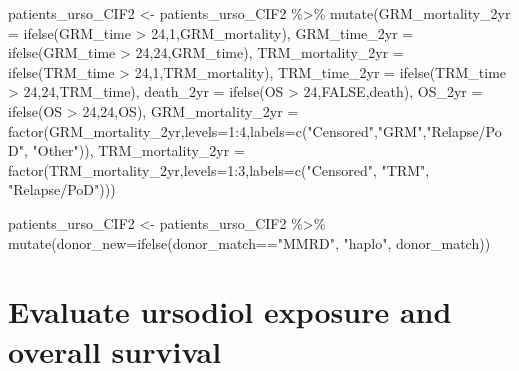 \documentclass[
]{book}
\newenvironment{Shaded}{\begin{snugshade}}{\end{snugshade}}
\newcommand{\AttributeTok}[1]{\textcolor[rgb]{0.77,0.63,0.00}{#1}}
\newcommand{\ConstantTok}[1]{\textcolor[rgb]{0.00,0.00,0.00}{#1}}
\newcommand{\DecValTok}[1]{\textcolor[rgb]{0.00,0.00,0.81}{#1}}
\newcommand{\FunctionTok}[1]{\textcolor[rgb]{0.00,0.00,0.00}{#1}}
\newcommand{\NormalTok}[1]{#1}
\newcommand{\OtherTok}[1]{\textcolor[rgb]{0.56,0.35,0.01}{#1}}
\newcommand{\SpecialCharTok}[1]{\textcolor[rgb]{0.00,0.00,0.00}{#1}}
\newcommand{\StringTok}[1]{\textcolor[rgb]{0.31,0.60,0.02}{#1}}
\begin{document}
\begin{Shaded}
\begin{Highlighting}[]
\NormalTok{patients\_urso\_CIF2 }\OtherTok{\textless{}{-}}\NormalTok{ patients\_urso\_CIF2 }\SpecialCharTok{\%\textgreater{}\%} 
  \FunctionTok{mutate}\NormalTok{(}\AttributeTok{GRM\_mortality\_2yr =} \FunctionTok{ifelse}\NormalTok{(GRM\_time }\SpecialCharTok{\textgreater{}} \DecValTok{24}\NormalTok{,}\DecValTok{1}\NormalTok{,GRM\_mortality), }
         \AttributeTok{GRM\_time\_2yr =} \FunctionTok{ifelse}\NormalTok{(GRM\_time }\SpecialCharTok{\textgreater{}} \DecValTok{24}\NormalTok{,}\DecValTok{24}\NormalTok{,GRM\_time), }
         \AttributeTok{TRM\_mortality\_2yr =} \FunctionTok{ifelse}\NormalTok{(TRM\_time }\SpecialCharTok{\textgreater{}} \DecValTok{24}\NormalTok{,}\DecValTok{1}\NormalTok{,TRM\_mortality), }
         \AttributeTok{TRM\_time\_2yr =} \FunctionTok{ifelse}\NormalTok{(TRM\_time }\SpecialCharTok{\textgreater{}} \DecValTok{24}\NormalTok{,}\DecValTok{24}\NormalTok{,TRM\_time), }
         \AttributeTok{death\_2yr =} \FunctionTok{ifelse}\NormalTok{(OS }\SpecialCharTok{\textgreater{}} \DecValTok{24}\NormalTok{,}\ConstantTok{FALSE}\NormalTok{,death), }
         \AttributeTok{OS\_2yr =} \FunctionTok{ifelse}\NormalTok{(OS }\SpecialCharTok{\textgreater{}} \DecValTok{24}\NormalTok{,}\DecValTok{24}\NormalTok{,OS),}
         \AttributeTok{GRM\_mortality\_2yr =} \FunctionTok{factor}\NormalTok{(GRM\_mortality\_2yr,}\AttributeTok{levels=}\DecValTok{1}\SpecialCharTok{:}\DecValTok{4}\NormalTok{,}\AttributeTok{labels=}\FunctionTok{c}\NormalTok{(}\StringTok{"Censored"}\NormalTok{,}\StringTok{"GRM"}\NormalTok{,}\StringTok{"Relapse/PoD"}\NormalTok{,  }\StringTok{"Other"}\NormalTok{)),  }
         \AttributeTok{TRM\_mortality\_2yr =} \FunctionTok{factor}\NormalTok{(TRM\_mortality\_2yr,}\AttributeTok{levels=}\DecValTok{1}\SpecialCharTok{:}\DecValTok{3}\NormalTok{,}\AttributeTok{labels=}\FunctionTok{c}\NormalTok{(}\StringTok{"Censored"}\NormalTok{,  }\StringTok{"TRM"}\NormalTok{, }\StringTok{"Relapse/PoD"}\NormalTok{)))}

\NormalTok{patients\_urso\_CIF2 }\OtherTok{\textless{}{-}}\NormalTok{ patients\_urso\_CIF2 }\SpecialCharTok{\%\textgreater{}\%} \FunctionTok{mutate}\NormalTok{(}\AttributeTok{donor\_new=}\FunctionTok{ifelse}\NormalTok{(donor\_match}\SpecialCharTok{==}\StringTok{"MMRD"}\NormalTok{, }\StringTok{"haplo"}\NormalTok{, donor\_match))}
\end{Highlighting}
\end{Shaded}

\hypertarget{evaluate-ursodiol-exposure-and-overall-survival}{%
\section{Evaluate ursodiol exposure and overall survival}\label{evaluate-ursodiol-exposure-and-overall-survival}}
\end{document}
